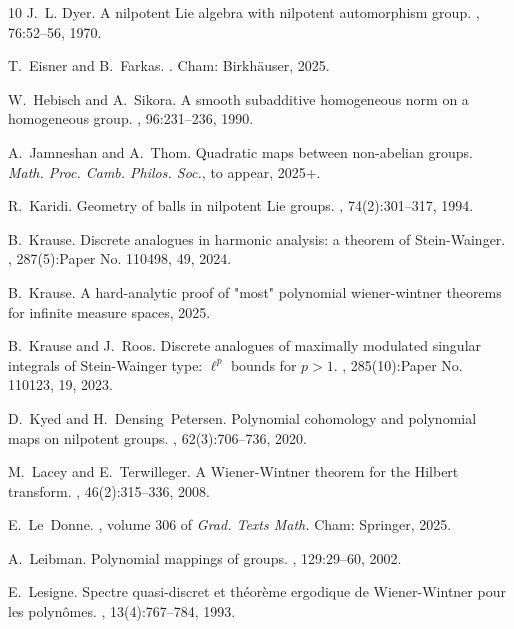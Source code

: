 \documentclass[12pt,reqno,a4paper,dvipsnames]{amsart}
\theoremstyle{plain}
\theoremstyle{definition}
\numberwithin{theorem}{section}
\numberwithin{equation}{section}
\begin{document}
\begin{thebibliography}{10}
J.~L. Dyer.
\newblock A nilpotent {Lie} algebra with nilpotent automorphism group.
, 76:52--56, 1970.

T.~Eisner and B.~Farkas.
.
\newblock Cham: Birkh{\"a}user, 2025.

W.~Hebisch and A.~Sikora.
\newblock A smooth subadditive homogeneous norm on a homogeneous group.
, 96:231--236, 1990.

A.~Jamneshan and A.~Thom.
\newblock Quadratic maps between non-abelian groups.
\newblock \emph{Math. Proc. Camb. Philos. Soc.}, to appear, 2025+.

R.~Karidi.
\newblock Geometry of balls in nilpotent {L}ie groups.
, 74(2):301--317, 1994.

B.~Krause.
\newblock Discrete analogues in harmonic analysis: a theorem of {S}tein-{W}ainger.
, 287(5):Paper No. 110498, 49, 2024.

B.~Krause.
\newblock A hard-analytic proof of "most" polynomial wiener-wintner theorems for infinite measure spaces, 2025.

B.~Krause and J.~Roos.
\newblock Discrete analogues of maximally modulated singular integrals of {S}tein-{W}ainger type: {$\ell^p$} bounds for {$p > 1$}.
, 285(10):Paper No. 110123, 19, 2023.

D.~Kyed and H.~Densing~Petersen.
\newblock Polynomial cohomology and polynomial maps on nilpotent groups.
, 62(3):706--736, 2020.

M.~Lacey and E.~Terwilleger.
\newblock A {W}iener-{W}intner theorem for the {H}ilbert transform.
, 46(2):315--336, 2008.

E.~Le~Donne.
, volume 306 of {\em Grad. Texts Math.}
\newblock Cham: Springer, 2025.

A.~Leibman.
\newblock Polynomial mappings of groups.
, 129:29--60, 2002.

E.~Lesigne.
\newblock Spectre quasi-discret et th\'eor\`eme ergodique de {W}iener-{W}intner pour les polyn\^omes.
, 13(4):767--784, 1993.


\end{thebibliography}
\end{document}
